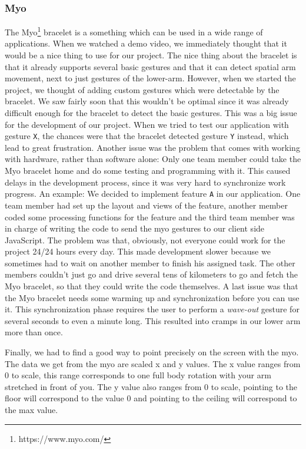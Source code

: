 \documentclass{article}
\begin{document}
\subsubsection{Myo}
The Myo\footnote{https://www.myo.com/} bracelet is a something which can be used in a wide range of applications. When we watched a demo video, we immediately thought that it would be a nice thing to use for our project. The nice thing about the bracelet is that it already supports several basic gestures and that it can detect spatial arm movement, next to just gestures of the lower-arm. However, when we started the project, we thought of adding custom gestures which were detectable by the bracelet. We saw fairly soon that this wouldn't be optimal since it was already difficult enough for the bracelet to detect the basic gestures. This was a big issue for the development of our project. When we tried to test our application with gesture \texttt{X}, the chances were that the bracelet detected gesture \texttt{Y} instead, which lead to great frustration.
Another issue was the problem that comes with working with hardware, rather than software alone: Only one team member could take the Myo bracelet home and do some testing and programming with it. This caused delays in the development process, since it was very hard to synchronize work progress. An example: We decided to implement feature \texttt{A} in our application. One team member had set up the layout and views of the feature, another member coded some processing functions for the feature and the third team member was in charge of writing the code to send the myo gestures to our client side JavaScript. The problem was that, obviously, not everyone could work for the project 24/24 hours every day. This made development slower because we sometimes had to wait on another member to finish his assigned task. The other members couldn't just go and drive several tens of kilometers to go and fetch the Myo bracelet, so that they could write the code themselves.
A last issue was that the Myo bracelet needs some warming up and synchronization before you can use it. This synchronization phase requires the user to perform a \textit{wave-out} gesture for several seconds to even a minute long. This resulted into cramps in our lower arm more than once.

Finally, we had to find a good way to point precisely on the screen with the myo. The data we get from the myo are scaled x and y values. The x value ranges from 0 to scale, this range corresponds to one full body rotation with your arm stretched in front of you. The y value also ranges from 0 to scale, pointing to the floor will correspond to the value 0 and pointing to the ceiling will correspond to the max value. 
\end{document}
